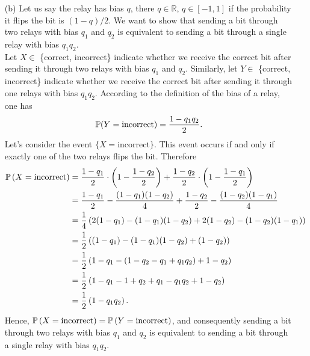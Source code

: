 \begin{enumerate}
   \item[(b)] Let us say the relay has bias $q$, there $q \in \mathbb{R}$,
   $q \in [-1, 1]$ if the probability it flips the bit is $(1 - q)/2$. We want
   to show that sending a bit through two relays with bias $q_1$ and $q_2$ is
   equivalent to sending a bit through a single relay with bias $q_1q_2$. \\
   Let $X \in $ \{correct, incorrect\} indicate whether we receive the correct bit
   after sending it through two relays with bias $q_1$ and $q_2$. Similarly, let
   $Y \in $ \{correct, incorrect\} indicate whether we receive the correct bit
   after sending it through one relays with bias $q_1q_2$. According to the
   definition of the bias of a relay, one has
   \[ \mathbb{P}(Y = \text{incorrect}) = \frac{1 - q_1q_2}{2}. \]
   Let's consider the event $\{ X = \text{incorrect} \}$. This event occurs if and
   only if exactly one of the two relays flips the bit. Therefore
   \begin{align*}
     \mathbb{P}\left( X = \text{incorrect} \right)
      &= \frac{1-q_1}{2} \cdot \left(1 - \frac{1-q_2}{2}\right) +
         \frac{1-q_2}{2} \cdot \left(1 - \frac{1-q_1}{2}\right) \\
      &= \frac{1-q_1}{2} - \frac{(1-q_1)(1-q_2)}{4} +
         \frac{1-q_2}{2} - \frac{(1-q_2)(1-q_1)}{4} \\
      &= \frac{1}{4} \left( 2(1-q_1) - (1-q_1)(1-q_2) + 2(1-q_2) - (1-q_2)(1-q_1) \right) \\
      &= \frac{1}{2} \left((1-q_1) - (1-q_1)(1-q_2) + (1-q_2) \right) \\
      &= \frac{1}{2} \left(1 - q_1 - (1 - q_2 - q_1 + q_1q_2) + 1 - q_2 \right) \\
      &= \frac{1}{2} \left(1 - q_1 - 1 + q_2 + q_1 - q_1q_2 + 1 - q_2 \right) \\
      &= \frac{1}{2} \left(1 - q_1q_2 \right). \\
   \end{align*}
   Hence, $\mathbb{P}\left( X = \text{incorrect} \right) = \mathbb{P}\left( Y = \text{incorrect}
   \right)$, and consequently sending a bit through two relays with bias $q_1$ and
   $q_2$ is equivalent to sending a bit through a single relay with bias $q_1q_2$.


\end{enumerate}
